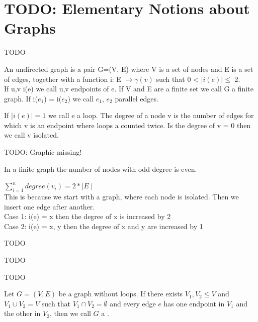 \chapter{TODO: Elementary Notions about Graphs}

\begin{descr}
    TODO
\end{descr}


\begin{definition}
	An undirected graph is a pair G=(V, E) where V is a set of nodes and E is a set of edges, together with a function i: E $\rightarrow \gamma(v)$ such that 0 < $\mid i(e) \mid  \le $ 2.
\\
If u,v i(e) we call u,v endpoints of e. If V and E are a finite set we call G a finite graph. If i($e{_1}$) =  i($e{_2}$) we call  $e{_1}$, $e{_2}$ parallel edges.

If $\mid i(e) \mid = 1$ we call e a loop. The degree of a node v is the number of edges for which v is an endpoint where loops a counted twice.
Is the degree of v = 0 then we call v isolated.
\end{definition}

\begin{example*}
    TODO: Graphic missing!
\end{example*}

\begin{lemma}
    In a finite graph the number of nodes with odd degree is even.
\end{lemma}


\begin{prooof}
    $\sum\limits_{i=1}^n degree(v{_i}) = 2* \mid E \mid$ \\
This is because we start with a graph, where each node is isolated. Then we insert one edge after another.\\
Case 1: i(e) = {x} then the degree of x is increased by 2\\
Case 2: i(e) = {x, y} then the degree of x and y are increased by 1
 
\end{prooof}


\begin{definition}
    TODO
\end{definition}
\begin{definition}
    TODO
\end{definition}
\begin{lemma}
    TODO
\end{lemma}

\begin{definition}
    Let $G = (V,E)$ be a graph without loops. If there exists $V_{1}, V_{2} \leq V$ and $V_{1} \cup V_{2} = V$
    such that $V_{1} \cap V_{2} = \emptyset$ and every edge $e$ has one endpoint in $V{_1}$ and the other in $V_{2}$,
    then we call $G$ a .
\end{definition}

